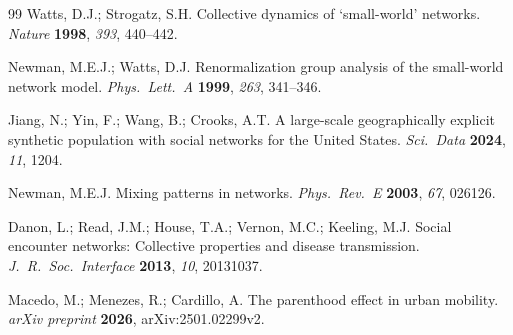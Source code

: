 \documentclass[a4paper,12pt]{article}
\begin{document}
\begin{thebibliography}{99}
Watts, D.J.; Strogatz, S.H.
Collective dynamics of `small-world' networks.
\textit{Nature} \textbf{1998}, \textit{393}, 440--442.

Newman, M.E.J.; Watts, D.J.
Renormalization group analysis of the small-world network model.
\textit{Phys.\ Lett.\ A} \textbf{1999}, \textit{263}, 341--346.

Jiang, N.; Yin, F.; Wang, B.; Crooks, A.T.
A large-scale geographically explicit synthetic population with social networks
for the United States.
\textit{Sci.\ Data} \textbf{2024}, \textit{11}, 1204.

Newman, M.E.J.
Mixing patterns in networks.
\textit{Phys.\ Rev.\ E} \textbf{2003}, \textit{67}, 026126.

Danon, L.; Read, J.M.; House, T.A.; Vernon, M.C.; Keeling, M.J.
Social encounter networks: Collective properties and disease transmission.
\textit{J.\ R.\ Soc.\ Interface} \textbf{2013}, \textit{10}, 20131037.

Macedo, M.; Menezes, R.; Cardillo, A.
The parenthood effect in urban mobility.
\textit{arXiv preprint} \textbf{2026}, arXiv:2501.02299v2.

\end{thebibliography}
\end{document}
